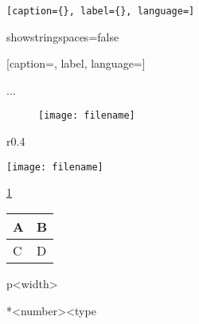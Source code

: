 \begin{lstlisting}[caption={}, label={}, language=]
\end{lstlisting}

showstringspaces=false

[caption={}, label{}, language=]

\begin{framed}...\end{framed}



\begin{figure}[H]
\begin{center}
	\texttt{[image: filename]}
	\caption{}
	\label{}
\end{center}
\end{figure}

\begin{wrapfigure}{r}{0.4\textwidth} %
	\vspace{-35pt} %
	\begin{center}
		\texttt{[image: filename]}
	\end{center}
	\vspace{-10pt} %
\end{wrapfigure}



\ref{}

\cite{}



\bgroup
\def\arraystretch{1.5} %
\setlength{\tabcolsep}{6pt} %
\begin{tabular*}{\textwidth}{m{} | m{}}
	A & B\\
	\hline C & D\\
\end{tabular*} 
\egroup

p{<width>}

*{<number>}{<type}


